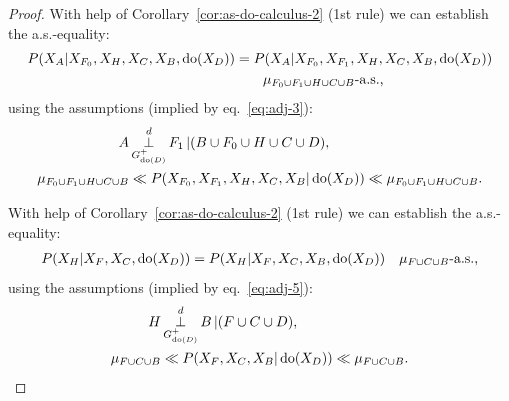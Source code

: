 \begin{Thm}
\begin{proof}
With help of Corollary~\ref{cor:as-do-calculus-2} (1st rule) we can establish the a.s.-equality:
    \begin{align}
        P(X_A|X_{F_0},X_H,X_C,X_B,\operatorname{do}(X_D)) &= P(X_A|X_{F_0},X_{F_1},X_H,X_C,X_B,\operatorname{do}(X_D)) \label{eq:adj-eq-8}\\ 
                           &\qquad \mu_{F_0 \cup F_1 \cup H \cup C \cup B}\text{-a.s.,} \notag 
    \end{align}
using the assumptions (implied by eq.\ \ref{eq:adj-3}):
\begin{align*}
    A & \operatorname*{\perp}^d_{G^+_{\operatorname{do}(D)}} F_1 \operatorname*{|} (B \cup F_0 \cup H \cup C \cup D),\\
    \mu_{F_0 \cup F_1 \cup H \cup C \cup B} & \ll P(X_{F_0},X_{F_1},X_H,X_C,X_B|\operatorname{do}(X_D)) \ll \mu_{F_0\cup F_1  \cup H \cup C \cup B}.
\end{align*}

With help of Corollary~\ref{cor:as-do-calculus-2} (1st rule) we can establish the a.s.-equality:
    \begin{align}
        P(X_H|X_F,X_C,\operatorname{do}(X_D)) &= P(X_H|X_F,X_C,X_B,\operatorname{do}(X_D)) &\mu_{F \cup C \cup B}\text{-a.s.,} \label{eq:adj-eq-9}
    \end{align}
using the assumptions (implied by eq.\ \ref{eq:adj-5}):
\begin{align*}
    H &\operatorname*{\perp}^d_{G^+_{\operatorname{do}(D)}} B \operatorname*{|} (F \cup C \cup D),\\
    \mu_{F \cup C \cup B} & \ll P(X_F,X_C,X_B|\operatorname{do}(X_D)) \ll \mu_{F \cup C \cup B}.
\end{align*}


\end{proof}
\end{Thm}
